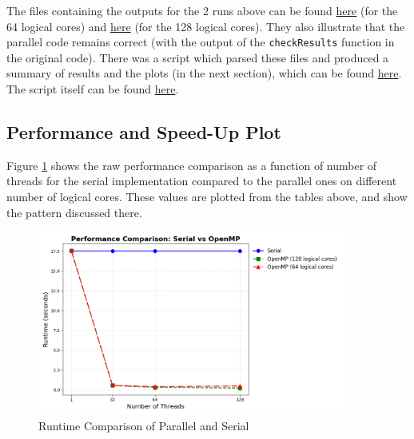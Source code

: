 \documentclass[a4paper,10pt]{article}
\begin{document}
The files containing the outputs for the 2 runs above can be found \href{https://github.com/paulmyr/DD2356-MethodsHPC/blob/master/3_open_mp/exercise4/outputs/dftw_omp_output_64.txt}{here} (for the 64 logical cores) and \href{https://github.com/paulmyr/DD2356-MethodsHPC/blob/master/3_open_mp/exercise4/outputs/dftw_omp_output_128.txt}{here} (for the 128 logical cores). They also illustrate that the parallel code remains correct (with the output of the \verb|checkResults| function in the original code). There was a script which parsed these files and produced a summary of results and the plots (in the next section), which can be found \href{https://github.com/paulmyr/DD2356-MethodsHPC/blob/master/3_open_mp/exercise4/outputs/plotting_script_output.txt}{here}. The script itself can be found \href{https://github.com/paulmyr/DD2356-MethodsHPC/blob/master/3_open_mp/exercise4/parse_output_and_plot.py}{here}.

\subsection{Performance and Speed-Up Plot}

Figure \ref{fig:ex4_performance} shows the raw performance comparison as a function of number of threads for the serial implementation compared to the parallel ones on different number of logical cores. These values are plotted from the tables above, and show the pattern discussed there.

\begin{figure}[H]
  \centering
  \includegraphics[width=0.9\textwidth]{img/ex4/performance_comparison.png}
  \caption{Runtime Comparison of Parallel and Serial}
  \label{fig:ex4_performance}
\end{figure}
\end{document}

